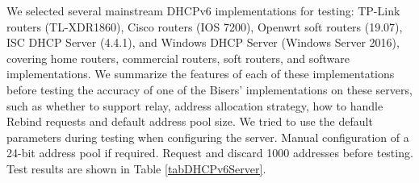 \documentclass[conference]{IEEEtran}
\begin{document}
\begin{table}[htbp]
  \caption{SDeHCP experiment result.}
  \begin{center}
    \label{tabSDeHCP}
  \end{center}
\end{table}

We selected several mainstream DHCPv6 implementations for testing:
TP-Link routers (TL-XDR1860), Cisco routers (IOS 7200), Openwrt soft
routers (19.07), ISC DHCP Server (4.4.1), and Windows DHCP Server
(Windows Server 2016), covering home routers, commercial routers, soft
routers, and software implementations. We summarize the features of
each of these implementations before testing the accuracy of one of
the Bisers' implementations on these servers, such as whether to
support relay, address allocation strategy, how to handle Rebind
requests and default address pool size. We tried to use the default
parameters during testing when configuring the server. Manual
configuration of a 24-bit address pool if required. Request and
discard 1000 addresses before testing. Test results are shown in Table
\ref{tabDHCPv6Server}.

\begin{table}[htbp]
  \caption{Mainstream DHCPv6 implementations test results.}
  \begin{center}
    \label{tabDHCPv6Server}
  \end{center}
\end{table}
\end{document}
